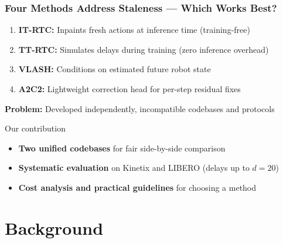 \documentclass[aspectratio=1610]{beamer}
\begin{document}
\begin{frame}
\frametitle{Four Methods Address Staleness --- Which Works Best?}

\begin{enumerate}
    \item \textbf{IT-RTC:} Inpaints fresh actions at inference time (training-free)
    \item \textbf{TT-RTC:} Simulates delays during training (zero inference overhead)
    \item \textbf{VLASH:} Conditions on estimated future robot state
    \item \textbf{A2C2:} Lightweight correction head for per-step residual fixes
\end{enumerate}

\vspace{0.5em}
\textbf{Problem:} Developed independently, incompatible codebases and protocols

\vspace{0.5em}
\begin{block}{Our contribution}
\begin{itemize}
    \item \textbf{Two unified codebases} for fair side-by-side comparison
    \item \textbf{Systematic evaluation} on Kinetix and LIBERO (delays up to $d = 20$)
    \item \textbf{Cost analysis and practical guidelines} for choosing a method
\end{itemize}
\end{block}

\end{frame}

\section{Background}
\end{document}
